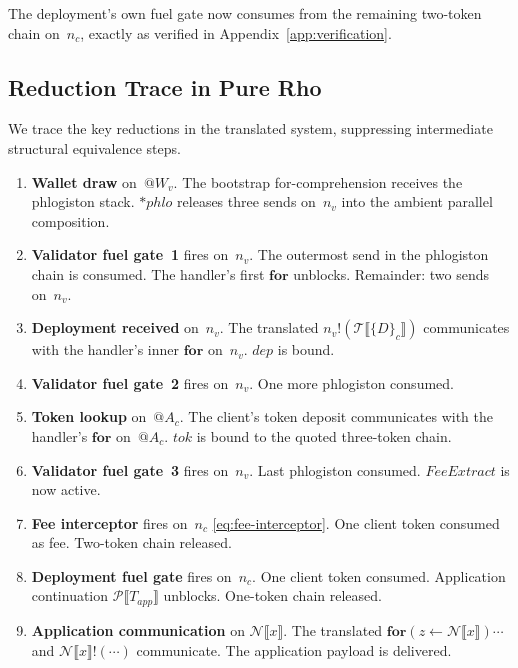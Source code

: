 \documentclass[11pt,a4paper]{article}
\makeatletter
\newcommand{\lsem}{\llbracket}
\newcommand{\rsem}{\rrbracket}
\newcommand{\forc}{\mathbf{for}}
\newcommand{\send}[2]{#1 !\!\left( #2 \right)}
\newcommand{\recv}[3]{\forc\!\left( #1 \leftarrow #2 \right) #3}
\newcommand{\drop}[1]{{\ast} #1}
\newcommand{\quot}[1]{@#1}
\newcommand{\signed}[2]{\{#1\}_{#2}}
\makeatother
\begin{document}
\noindent
The deployment's own fuel gate now consumes from the
remaining two-token chain on~$n_c$, exactly as verified in
Appendix~\ref{app:verification}.

\subsection{Reduction Trace in Pure Rho}
\label{app:ex-trace-rho}

We trace the key reductions in the translated system,
suppressing intermediate structural equivalence steps.

\begin{enumerate}[label=\textbf{Step \arabic*.}, leftmargin=3em, start=0]
  \item \textbf{Wallet draw} on~$\quot{W_v}$.  The bootstrap
    for-comprehension receives the phlogiston stack.
    $\drop{\mathit{phlo}}$ releases three sends on~$n_v$
    into the ambient parallel composition.

  \item \textbf{Validator fuel gate~1} fires on~$n_v$.
    The outermost send in the phlogiston chain is
    consumed.  The handler's first $\forc$ unblocks.
    Remainder: two sends on~$n_v$.

  \item \textbf{Deployment received} on~$n_v$.  The
    translated $\send{n_v}{\mathcal{T}\lsem\signed{D}{c}\rsem}$
    communicates with the handler's inner $\forc$ on~$n_v$.
    $\mathit{dep}$ is bound.

  \item \textbf{Validator fuel gate~2} fires on~$n_v$.
    One more phlogiston consumed.

  \item \textbf{Token lookup} on~$\quot{A_c}$.  The
    client's token deposit communicates with the handler's
    $\forc$ on~$\quot{A_c}$.  $\mathit{tok}$ is bound
    to the quoted three-token chain.

  \item \textbf{Validator fuel gate~3} fires on~$n_v$.
    Last phlogiston consumed.  $\mathit{FeeExtract}$
    is now active.

  \item \textbf{Fee interceptor} fires on~$n_c$
    \eqref{eq:fee-interceptor}.  One client token consumed
    as fee.  Two-token chain released.

  \item \textbf{Deployment fuel gate} fires on~$n_c$.
    One client token consumed.  Application continuation
    $\mathcal{P}\lsem T_{\mathit{app}} \rsem$ unblocks.
    One-token chain released.

  \item \textbf{Application communication} on
    $\mathcal{N}\lsem x \rsem$.  The translated
    $\recv{z}{\mathcal{N}\lsem x \rsem}{\cdots}$ and
    $\send{\mathcal{N}\lsem x \rsem}{\cdots}$
    communicate.  The application payload is delivered.
\end{enumerate}
\end{document}
